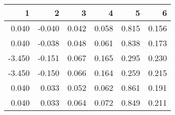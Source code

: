 \begin{table}[ht]
\centering
\begin{tabular}{rrrrrr}
  \hline
1 & 2 & 3 & 4 & 5 & 6 \\ 
  \hline
0.040 & -0.040 & 0.042 & 0.058 & 0.815 & 0.156 \\ 
  0.040 & -0.038 & 0.048 & 0.061 & 0.838 & 0.173 \\ 
  -3.450 & -0.151 & 0.067 & 0.165 & 0.295 & 0.230 \\ 
  -3.450 & -0.150 & 0.066 & 0.164 & 0.259 & 0.215 \\ 
  0.040 & 0.033 & 0.052 & 0.062 & 0.861 & 0.191 \\ 
  0.040 & 0.033 & 0.064 & 0.072 & 0.849 & 0.211 \\ 
   \hline
\end{tabular}
\end{table}
